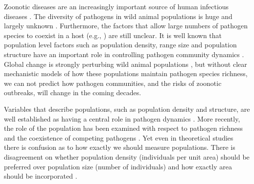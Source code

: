 Zoonotic diseases are an increasingly important source of human infectious diseases \cite{jones2008global, woolhouse2006host, taylor2001risk}.
The diversity of pathogens in wild animal populations is huge and largely unknown \cite{poulin2014parasite}.
Furthermore, the factors that allow large numbers of pathogen species to coexist in a host (e.g., \textcite{anthony2013strategy}) are still unclear.
It is well known that population level factors such as population density, range size and population structure have an important role in controlling pathogen community dynamics \cite{anderson1979population, may1979population, colizza2007invasion, may2001infection}.
Global change is strongly perturbing wild animal populations \cite{thomas2004extinction, craigie2010large}, but without clear mechanistic models of how these populations maintain pathogen species richness, we can not predict how pathogen communities, and the risks of zoonotic outbreaks, will change in the coming decades.






Variables that describe populations, such as population density and structure, are well established as having a central role in pathogen dynamics \cite{colizza2007invasion, barthelemy2010fluctuation, colizza2007invasion,  wu2013threshold, may1979population, anderson1979population}.
More recently, the role of the population has been examined with respect to pathogen richness and the coexistence of competing pathogens \cite{qiu2013vector, allen2004sis, nunes2006localized}.
Yet even in theoretical studies there is confusion as to how exactly we should measure populations.
There is disagreement on whether population density (individuals per unit area) should be preferred over population size (number of individuals) and how exactly area should be incorporated \cite{begon2002clarification}. 


